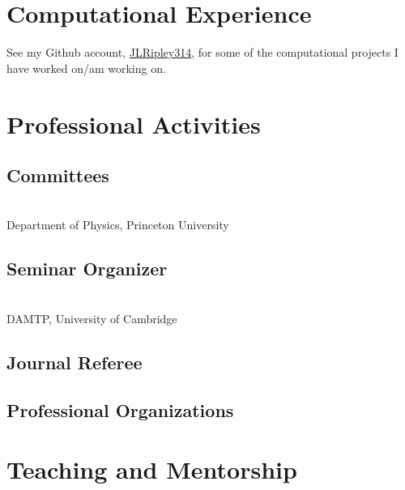 \documentclass{my_cv}
\begin{document}
\section{Computational Experience}
   See my Github account, \href{https://github.com/JLRipley314}{JLRipley314},
   for some of the computational projects I have worked on/am working on.
\section{Professional Activities}
\subsection{Committees}
   \\ \indent
   Department of Physics, Princeton University
\subsection{Seminar Organizer}
   \\ \indent
   DAMTP, University of Cambridge
\subsection{Journal Referee}
\subsection{Professional Organizations}
\section{Teaching and Mentorship}
\end{document}
